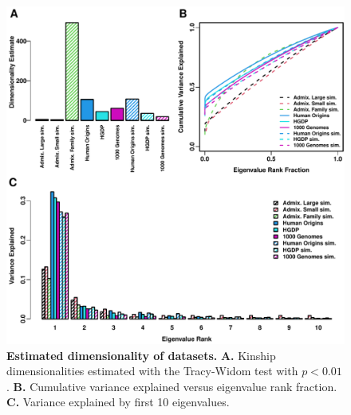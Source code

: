 \documentclass[11pt]{article}
\begin{document}
\begin{figure}[hp!]
  \centering
  \includegraphics[width=\textwidth]{eigen.pdf}
  \caption{
    {\bf Estimated dimensionality of datasets.}
    \textbf{A.}
    Kinship dimensionalities estimated with the Tracy-Widom test with $p < 0.01$.
    \textbf{B.}
    Cumulative variance explained versus eigenvalue rank fraction.
    \textbf{C.}
    Variance explained by first 10 eigenvalues.
  }
  \label{fig:eigen}
\end{figure}
\end{document}
